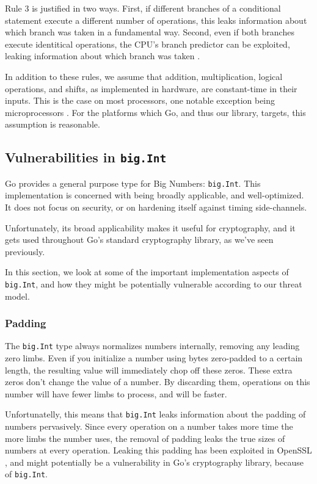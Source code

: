 \documentclass[11pt, a4paper]{article} %
\begin{document}
{Rule 3 is justified in two ways. First, if different branches of a conditional
statement execute a different number of operations, this leaks information
about which branch was taken in a fundamental way. Second, even if both
branches execute identitical operations, the CPU's branch predictor
can be exploited, leaking information about which branch was taken
\cite{
  aciicmez_predicting_2006,
  aciicmez_power_2007,
  evtyushkin_jump_2016}.

In addition to these rules, we assume that addition, multiplication,
logical operations, and shifts, as implemented in hardware,
are constant-time in their inputs.
This is the case on most processors, one notable exception being
microprocessors
\cite{pornin_bearssl_nodate}. For the platforms which Go,
and thus our library, targets,
this assumption is reasonable.

\subsection{Vulnerabilities in \texttt{big.Int}}

Go provides a general purpose type for Big Numbers: \texttt{big.Int}.
This implementation is concerned with being broadly applicable,
and well-optimized. It does not focus on security, or on hardening
itself against timing side-channels.

Unfortunately, its broad applicability makes it useful for cryptography,
and it gets used throughout Go's standard cryptography library,
as we've seen previously.

In this section, we look at some of the important implementation aspects
of \texttt{big.Int}, and how they might be potentially vulnerable
according to our threat model.

\subsubsection{Padding}

The \texttt{big.Int} type always normalizes numbers internally,
removing any leading zero limbs. Even if you initialize a number
using bytes zero-padded to a certain length, the resulting value
will immediately chop off these zeros. These extra zeros don't
change the value of a number. By discarding them, operations on
this number will have fewer limbs to process, and will be faster.

Unfortunatelly, this means that \texttt{big.Int} leaks information
about the padding of numbers pervasively. Since every operation on
a number takes more time the more limbs the number uses,
the removal of padding leaks the true sizes of numbers
at every operation.
Leaking this padding has been exploited
in OpenSSL \cite{merget_raccoon_2019}, and might potentially
be a vulnerability in Go's cryptography library, because of \texttt{big.Int}.

}
\end{document}
